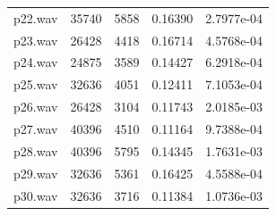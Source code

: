 \documentclass[a4paper,11pt]{article}
\begin{document}
\begin{center}
\begin{tabular}{c | c | c | c | c}
        p22.wav & 35740 & 5858 & 0.16390 & 2.7977e-04\\
        p23.wav & 26428 & 4418 & 0.16714 & 4.5768e-04\\
        p24.wav & 24875 & 3589 & 0.14427 & 6.2918e-04\\
        p25.wav & 32636 & 4051 & 0.12411 & 7.1053e-04\\
        p26.wav & 26428 & 3104 & 0.11743 & 2.0185e-03\\
        p27.wav & 40396 & 4510 & 0.11164 & 9.7388e-04\\
        p28.wav & 40396 & 5795 & 0.14345 & 1.7631e-03\\
        p29.wav & 32636 & 5361 & 0.16425 & 4.5588e-04\\
        p30.wav & 32636 & 3716 & 0.11384 & 1.0736e-03\\
        \hline
    \end{tabular}
\end{center}
\end{document}
